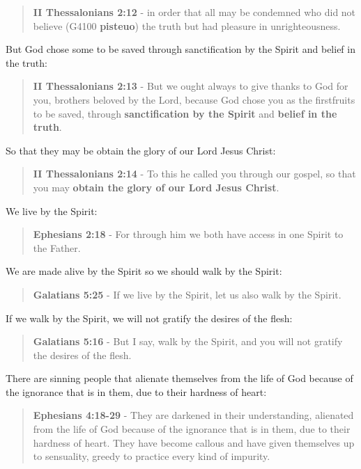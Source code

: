 \documentclass[11pt]{article}
\begin{document}
\begin{quote}
\textbf{II Thessalonians 2:12} - in order that all may be condemned who did not believe (G4100 \textbf{pisteuo}) the truth but had pleasure in unrighteousness.
\end{quote}

But God chose some to be saved through sanctification by the Spirit and belief in the truth:

\begin{quote}
\textbf{II Thessalonians 2:13} - But we ought always to give thanks to God for you, brothers beloved by the Lord, because God chose you as the firstfruits to be saved, through \textbf{sanctification by the Spirit} and \textbf{belief in the truth}.
\end{quote}

So that they may be obtain the glory of our Lord Jesus Christ:

\begin{quote}
\textbf{II Thessalonians 2:14} - To this he called you through our gospel, so that you may \textbf{obtain the glory of our Lord Jesus Christ}.
\end{quote}

We live by the Spirit:

\begin{quote}
\textbf{Ephesians 2:18} - For through him we both have access in one Spirit to the Father.
\end{quote}

We are made alive by the Spirit so we should walk by the Spirit:

\begin{quote}
\textbf{Galatians 5:25} - If we live by the Spirit, let us also walk by the Spirit.
\end{quote}

If we walk by the Spirit, we will not gratify the desires of the flesh:

\begin{quote}
\textbf{Galatians 5:16} - But I say, walk by the Spirit, and you will not gratify the desires of the flesh.
\end{quote}

There are sinning people that alienate themselves from the life of God because of the ignorance that is in them, due to their hardness of heart:

\begin{quote}
\textbf{Ephesians 4:18-29} - They are darkened in their understanding, alienated from the life of God because of the ignorance that is in them, due to their hardness of heart. They have become callous and have given themselves up to sensuality, greedy to practice every kind of impurity.
\end{quote}
\end{document}
